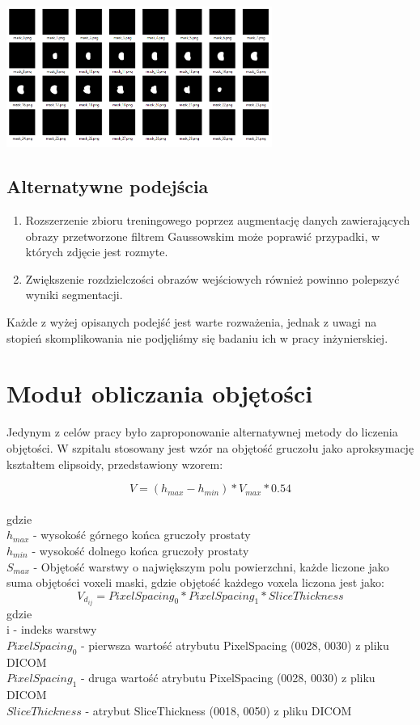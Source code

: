 \documentclass[a4paper,11pt,twoside]{report}
\theoremstyle{definition}
\begin{document}
\begin{minipage}[h]{\linewidth}
	\centering
	\includegraphics[width=0.65\textwidth]{segmentation/predykcje_segmentacji.png}
\end{minipage}




\subsection{Alternatywne podejścia}
\begin{enumerate}
\item Rozszerzenie zbioru treningowego poprzez augmentację danych zawierających obrazy przetworzone filtrem Gaussowskim może poprawić przypadki, w których zdjęcie jest rozmyte.
\item Zwiększenie rozdzielczości obrazów wejściowych również powinno polepszyć wyniki segmentacji.
\end{enumerate}
Każde z wyżej opisanych podejść jest warte rozważenia, jednak z uwagi na stopień skomplikowania nie podjęliśmy się badaniu ich w pracy inżynierskiej.


\section{Moduł obliczania objętości}

Jedynym z celów pracy było zaproponowanie alternatywnej metody do liczenia objętości. W szpitalu stosowany jest wzór na objętość gruczołu jako aproksymację kształtem elipsoidy, przedstawiony wzorem:

\[V = (h_{max} - h_{min}) * V_{max} * 0.54\]
\\
gdzie 
\\
\(h_{max}\) - wysokość górnego końca gruczoły prostaty                     
\\
\(h_{min}\) - wysokość dolnego końca gruczoły prostaty                     
\\
\(S_{max}\) - Objętość warstwy o największym polu powierzchni, każde liczone jako suma objętości voxeli maski, gdzie objętość każdego voxela liczona jest jako:
\[ V_{d_{ij}} = PixelSpacing_0 * PixelSpacing_1 * SliceThickness\]
gdzie \\
i - indeks warstwy \\
\(PixelSpacing_0\) - pierwsza wartość atrybutu PixelSpacing (0028, 0030) z pliku DICOM \\
\(PixelSpacing_1\)  - druga wartość atrybutu PixelSpacing (0028, 0030) z pliku DICOM \\
\(SliceThickness\) - atrybut SliceThickness (0018, 0050) z pliku DICOM \\
\end{document}
